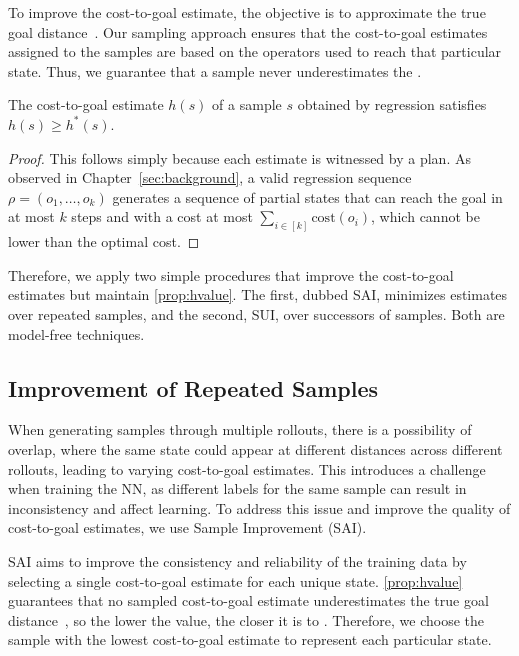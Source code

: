 To improve the cost-to-goal estimate, the objective is to approximate the true goal distance~\hstar. Our sampling approach ensures that the cost-to-goal estimates assigned to the samples are based on the operators used to reach that particular state. Thus, we guarantee that a sample never underestimates the \hstar.

\begin{property}
    \label{prop:hvalue}
    The cost-to-goal estimate $h(s)$ of a sample $s$ obtained by regression satisfies $h(s)\geq h^*(s)$.
\end{property}
\begin{proof}
    This follows simply because each estimate is witnessed by a plan. As observed in Chapter~\ref{sec:background}, a valid regression sequence $\rho=(o_1,\ldots,o_k)$ generates a sequence of partial states that can reach the goal in at most $k$ steps and with a cost at most $\sum_{i\in[k]}\text{cost}(o_i)$, which cannot be lower than the optimal cost.
\end{proof}

Therefore, we apply two simple procedures that improve the cost-to-goal estimates but maintain \cref{prop:hvalue}. The first, dubbed SAI, minimizes estimates over repeated samples, and the second, SUI, over successors of samples. Both are model-free techniques.

\subsection{Improvement of Repeated Samples}
\label{sec:hmin} 

When generating samples through multiple rollouts, there is a possibility of overlap, where the same state could appear at different distances across different rollouts, leading to varying cost-to-goal estimates. This introduces a challenge when training the NN, as different labels for the same sample can result in inconsistency and affect learning. To address this issue and improve the quality of cost-to-goal estimates, we use Sample Improvement (SAI).

SAI aims to improve the consistency and reliability of the training data by selecting a single cost-to-goal estimate for each unique state. \cref{prop:hvalue} guarantees that no sampled cost-to-goal estimate underestimates the true goal distance~\hstar, so the lower the value, the closer it is to \hstar. Therefore, we choose the sample with the lowest cost-to-goal estimate to represent each particular state.


